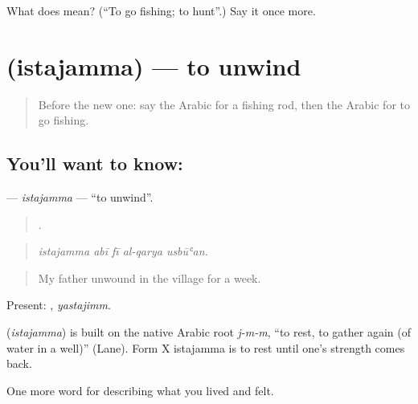 \begin{tcolorbox}[breakable,colback=teal!4,colframe=teal!35!black,title={Before you move on}]
What does  mean? (\textquotedblleft{}To go fishing; to hunt\textquotedblright{}.) Say it once more.
\end{tcolorbox}
\section[\texorpdfstring{\ar{استجم} (istajamma)}{استجم (istajamma)}]{ (istajamma) — to unwind}

\label{lesson:AR-C536-istajamma}



\begin{quote}
Before the new one: say the Arabic for a fishing rod, then the Arabic for to go fishing.
\end{quote}

\subsection*{You'll want to know: }
\textbf{} — \emph{istajamma} — \textquotedblleft{}to unwind\textquotedblright{}.

\begin{quote}
    .
\end{quote}

\begin{quote}
\emph{istajamma abī fī al-qarya usbūʿan.}
\end{quote}

\begin{quote}
My father unwound in the village for a week.
\end{quote}

Present: , \emph{yastajimm}.

\begin{cousinweb}
\textbf{} (\emph{istajamma}) is built on the native Arabic root \emph{j-m-m}, \textquotedblleft{}to rest, to gather again (of water in a well)\textquotedblright{} (Lane). Form X istajamma is to rest until one's strength comes back.
\end{cousinweb}

\begin{grammarlens}[title={What you've built}]
One more word for describing what you lived and felt.
\end{grammarlens}

